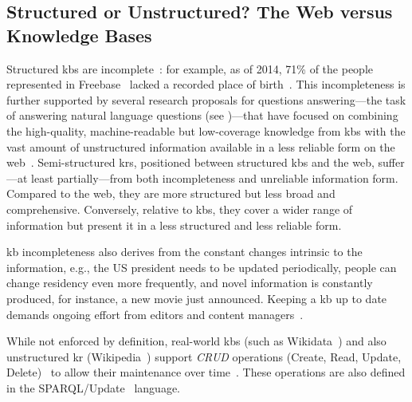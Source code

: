 \subsection{Structured or Unstructured? The Web versus Knowledge Bases}
\label{sec:incompleteness}
%
Structured \aclp{kb} are incomplete~\cite{west_kb_completion_2014,entityorientedsearch2018balog}: for example, as of 2014, 71\% of the people represented in Freebase~\cite{freebase_2008} lacked a recorded place of birth~\cite{west_kb_completion_2014}.
This incompleteness is further supported by several research proposals for questions answering---the task of answering natural language questions (see \todo{})---that have focused on combining the high-quality, machine-readable but low-coverage knowledge from \acp{kb} with the vast amount of unstructured information available in a less reliable form on the \acs{web}~\cite{sawant_neural_kg_web_2016,west_kb_completion_2014,savenkov_qa_kb_text_2016,PRAMANIK2024100833_uniqorn_qa_kb_text,lehmann2024beyond,zhang-etal-2024-spaghetti_heterogeneus_qa,xin_atomr_heterogeneus_kg_2025}.
%
Semi-structured \aclp{kr}, positioned between structured \acp{kb} and the \acs{web}, suffer---at least partially---from both incompleteness and unreliable information form. Compared to the \ac{web}, they are more structured but less broad and comprehensive. Conversely, relative to \acp{kb}, they cover a wider range of information but present it in a less structured and less reliable form.

\Ac{kb} incompleteness also derives from the constant changes intrinsic to the information, e.g., the US president needs to be updated periodically, people can change residency even more frequently, and novel information is constantly produced, for instance, a new movie just announced. Keeping a \ac{kb} up to date demands ongoing effort from editors and content managers~\cite{entityorientedsearch2018balog}.

While not enforced by definition, real-world \acp{kb} (such as Wikidata~\cite{wikidata,vrandevcic2014wikidata}) and also unstructured \ac{kr} (Wikipedia~\cite{wikipedia}) support \emph{CRUD} operations (Create, Read, Update, Delete)~\cite{elmasri2014fundamentals} to allow their maintenance over time~\cite{shafee2023ten_rules_editing_wikidata}. These operations are also defined in the SPARQL/Update~\cite{seaborne2008sparqlupdate} language.



